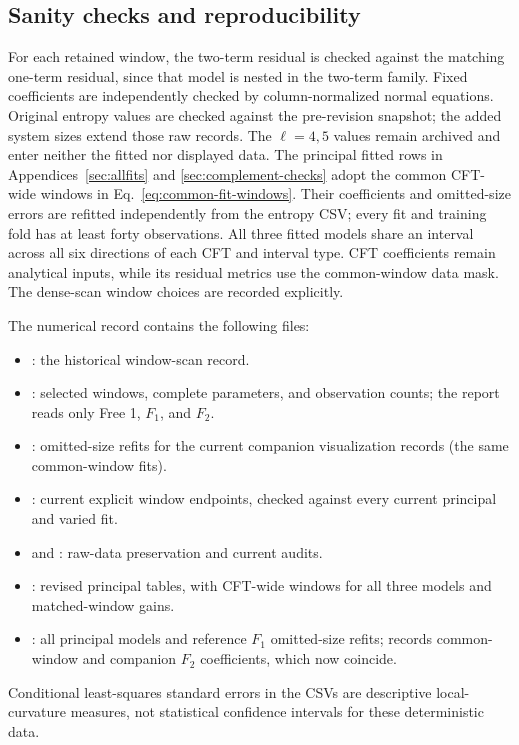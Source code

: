 \subsection{Sanity checks and reproducibility}
\label{sec:window-reproduction}
For each retained window, the two-term residual is checked against
the matching one-term residual, since that model is nested in the
two-term family. Fixed coefficients are independently checked by
column-normalized normal equations.
Original entropy values are checked against the pre-revision snapshot;
the added system sizes extend those raw records. The $\ell=4,5$ values
remain archived and enter neither the fitted nor displayed data.
The principal fitted rows in Appendices~\ref{sec:allfits} and
\ref{sec:complement-checks} adopt the common CFT-wide windows
in Eq.~\eqref{eq:common-fit-windows}. Their coefficients and omitted-size errors are refitted
independently from the entropy CSV; every fit and training fold has at
least forty observations. All three fitted models share an interval
across all six directions of each CFT and interval type. CFT coefficients remain analytical
inputs, while its residual metrics use the common-window data mask.
The dense-scan window choices are recorded explicitly.

The numerical record contains the following files:
\begin{itemize}
\item {}: the historical window-scan record.
\item {}: selected windows, complete parameters,
and observation counts; the report reads only Free 1, $F_1$, and $F_2$.
\item {}: omitted-size refits for the current
companion visualization records (the same common-window fits).
\item {}: current explicit window
endpoints, checked against every current principal and varied fit.
\item {} and
: raw-data preservation and current audits.
\item {}: revised principal tables, with
CFT-wide windows for all three models and matched-window gains.
\item {}: all principal models and reference $F_1$
omitted-size refits;  records common-window
and companion $F_2$ coefficients, which now coincide.
\end{itemize}
Conditional least-squares
standard errors in the CSVs are descriptive local-curvature measures,
not statistical confidence intervals for these deterministic data.

